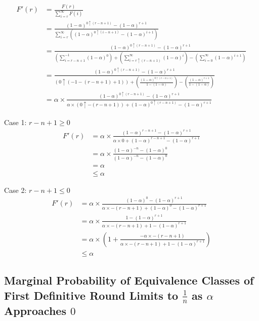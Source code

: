 \documentclass[12pt]{article}
\begin{document}
\begin{align*}
F'(r)
  &= \frac{F(r)}{\sum_{i=r}^{\infty} F(i)}
\\&= \frac{(1-\alpha)^{0 \uparrow (r-n+1)} - (1-\alpha)^{r+1}}{\sum_{i=r}^{\infty} ((1-\alpha)^{0 \uparrow (i-n+1)} - (1-\alpha)^{i+1})}
\\&= \frac{(1-\alpha)^{0 \uparrow (r-n+1)} - (1-\alpha)^{r+1}}{(\sum_{i=r-n+1}^{-1} (1-\alpha)^0) + (\sum_{i=r \uparrow (r-n+1)}^{\infty} (1-\alpha)^i) - (\sum_{i=0}^{\infty} (1-\alpha)^{i+1})}
\\&= \frac{(1-\alpha)^{0 \uparrow (r-n+1)} - (1-\alpha)^{r+1}}{(0 \uparrow (-1 - (r-n+1) + 1)) + (\frac{(1-\alpha)^{0 \uparrow (r-n+1)}}{1 - (1-\alpha)}) - (\frac{(1-\alpha)^{r+1}}{1 - (1-\alpha)})}
\\&= \alpha \times \frac{(1-\alpha)^{0 \uparrow (r-n+1)} - (1-\alpha)^{r+1}}{\alpha \times (0 \uparrow -(r-n+1)) + (1-\alpha)^{0 \uparrow (r-n+1)} - (1-\alpha)^{r+1}}
\end{align*}

Case 1: $r-n+1 \geq 0$
\begin{align*}
F'(r)
  &= \alpha \times \frac{(1-\alpha)^{r-n+1} - (1-\alpha)^{r+1}}{\alpha \times 0 + (1-\alpha)^{r-n+1} - (1-\alpha)^{r+1}}
\\&= \alpha \times \frac{(1-\alpha)^{-n} - (1-\alpha)^{0}}{(1-\alpha)^{-n} - (1-\alpha)^{0}}
\\&= \alpha
\\&\leq \alpha
\end{align*}

Case 2: $r-n+1 \leq 0$
\begin{align*}
F'(r)
  &= \alpha \times \frac{(1-\alpha)^0 - (1-\alpha)^{r+1}}{\alpha \times -(r-n+1) + (1-\alpha)^0 - (1-\alpha)^{r+1}}
\\&= \alpha \times \frac{1 - (1-\alpha)^{r+1}}{\alpha \times -(r-n+1) + 1 - (1-\alpha)^{r+1}}
\\&= \alpha \times (1 + \frac{-\alpha \times -(r-n+1)}{\alpha \times -(r-n+1) + 1 - (1-\alpha)^{r+1}})
\\&\leq \alpha
\end{align*}

\subsection{Marginal Probability of Equivalence Classes of First Definitive Round Limits to $\frac{1}{n}$ as $\alpha$ Approaches $0$}
\label{Appendix:ACBP:Probabilities:MarginalEquivalenceClassDefinitiveRoundApproaches1OverN}
\end{document}
